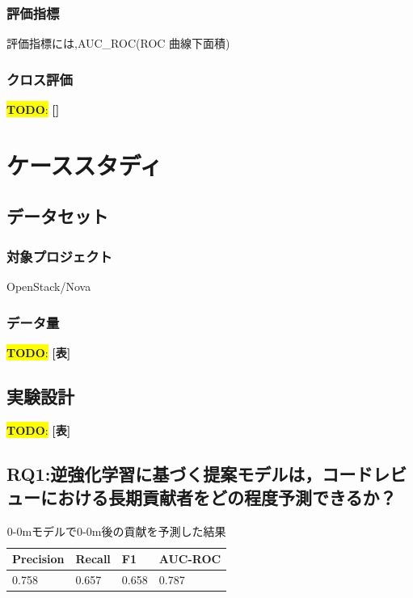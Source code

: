 \documentclass[submit,techrep,noauthor]{ipsj}
\newcommand{\todo}[1]{\colorbox{yellow}{{\bf TODO}:}{\color{red} {\textbf{[#1]}}}}
\begin{document}
\subsubsection{評価指標}
 評価指標には,AUC_ROC(ROC 曲線下面積)

\subsubsection{クロス評価}
\todo{}


\section{ケーススタディ}
\label{config}
\subsection{データセット}
\subsubsection{対象プロジェクト}
OpenStack/Nova
\subsubsection{データ量}
\todo{表}
\subsection{実験設計}
\todo{表}



\subsection{RQ1:逆強化学習に基づく提案モデルは，コードレビューにおける長期貢献者をどの程度予測できるか？}
\begin{table}[h]
    \centering
    \caption{0-0mモデルで0-0m後の貢献を予測した結果}
    \begin{tabularx}{\columnwidth}{XXXX}
       Precision & Recall & F1 & AUC-ROC \\
       \hline
       0.758  & 0.657 & 0.658 & 0.787 \\
       \hline
    \end{tabularx}
\end{table}
\end{document}
